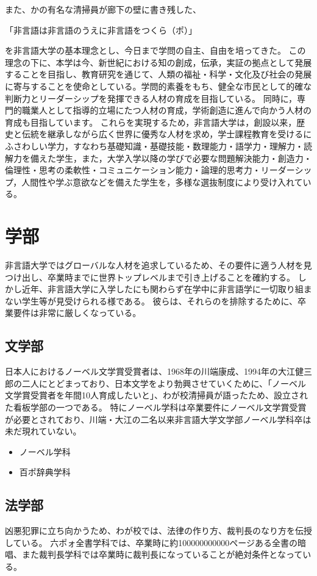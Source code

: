 また、かの有名な清掃員が廊下の壁に書き残した、
\begin{center}
「非言語は非言語のうえに非言語をつくら（ポ）」
\end{center}
を非言語大学の基本理念とし、今日まで学問の自主、自由を培ってきた。
この理念の下に、本学は今、新世紀における知の創成，伝承，実証の拠点として発展することを目指し、教育研究を通じて、人類の福祉・科学・文化及び社会の発展に寄与することを使命としている。学問的素養をもち、健全な市民として的確な判断力とリーダーシップを発揮できる人材の育成を目指している。
同時に，専門的職業人として指導的立場にたつ人材の育成，学術創造に進んで向かう人材の育成も目指しています。
これらを実現するため，非言語大学は，創設以来，歴史と伝統を継承しながら広く世界に優秀な人材を求め，学士課程教育を受けるにふさわしい学力，すなわち基礎知識・基礎技能・数理能力・語学力・理解力・読解力を備えた学生，また，大学入学以降の学びで必要な問題解決能力・創造力・倫理性・思考の柔軟性・コミュニケーション能力・論理的思考力・リーダーシップ，人間性や学ぶ意欲などを備えた学生を，多様な選抜制度により受け入れている。


\section{学部}
非言語大学ではグローバルな人材を追求しているため、その要件に適う人材を見つけ出し、卒業時までに世界トップレベルまで引き上げることを確約する。
しかし近年、非言語大学に入学したにも関わらず在学中に非言語学に一切取り組まない学生等が見受けられる様である。
彼らは、それらのを排除するために、卒業要件は非常に厳しくなっている。

\subsection{文学部}
日本人におけるノーベル文学賞受賞者は、1968年の川端康成、1994年の大江健三郎の二人にとどまっており、日本文学をより勃興させていくために、「ノーベル文学賞受賞者を年間10人育成したいと」、わが校清掃員が語ったため、設立された看板学部の一つである。
特にノーベル学科は卒業要件にノーベル文学賞受賞が必要とされており、川端・大江の二名以来非言語大学文学部ノーベル学科卒は未だ現れていない。
\begin{itemize}
\item ノーベル学科
\item 百ポ辞典学科
\end{itemize}

\subsection{法学部}
凶悪犯罪に立ち向かうため、わが校では、法律の作り方、裁判長のなり方を伝授している。
六ポォ全書学科では、卒業時に約100000000000ページある全書の暗唱、また裁判長学科では卒業時に裁判長になっていることが絶対条件となっている。

